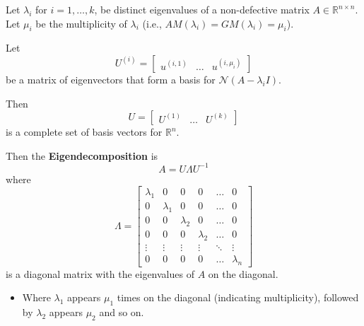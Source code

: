 \begin{theorem}
    Let $\lambda_i$ for $i = 1, \dots, k$, be distinct eigenvalues of a non-defective matrix $A \in \mathbb{R}^{n \times n}$. Let $\mu_i$ be the multiplicity of $\lambda_i$ (i.e., $AM(\lambda_i) = GM(\lambda_i) = \mu_i$).
    \vspace{1em}

    Let
    \[
    U^{(i)} = \begin{bmatrix} 
    u^{(i,1)} & \dots & u^{(i,\mu_i)}
    \end{bmatrix}
    \]
    be a matrix of eigenvectors that form a basis for $\mathcal{N}(A - \lambda_i I)$.
    \vspace{1em}

    Then 
    \[
    U = \begin{bmatrix} 
    U^{(1)} & \dots & U^{(k)}
    \end{bmatrix}
    \]
    is a complete set of basis vectors for $\mathbb{R}^n$.
    \vspace{1em}

    Then the \textbf{Eigendecomposition} is
    \[
    A = U \Lambda U^{-1}
    \]
    where 
    \[
    \Lambda = \begin{bmatrix}
    \lambda_1 & 0 & 0 & 0 & \dots & 0 \\
    0 & \lambda_1 & 0 & 0 & \dots & 0 \\
    0 & 0 & \lambda_2 & 0 & \dots & 0 \\
    0 & 0 & 0 & \lambda_2 & \dots & 0 \\
    \vdots & \vdots & \vdots & \vdots & \ddots & \vdots \\
    0 & 0 & 0 & 0 & \dots & \lambda_n
    \end{bmatrix}
    \]
    is a diagonal matrix with the eigenvalues of $A$ on the diagonal.
    \begin{itemize}
        \item Where $\lambda_1$ appears $\mu_1$ times on the diagonal (indicating multiplicity), followed by $\lambda_2$ appears $\mu_2$ and so on. 
    \end{itemize}
\end{theorem}

